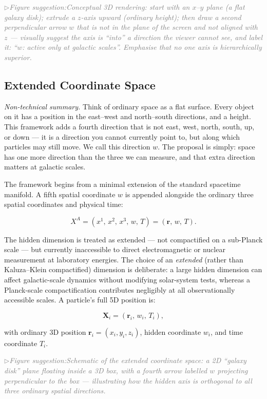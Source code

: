 \documentclass[11pt,a4paper]{article}
\newcommand{\XA}{X^A}                        %
\newcommand{\figsuggest}[1]{%
  \medskip
  \noindent\hspace{0pt}\textcolor{gray}{\small\itshape
    $\triangleright$\;Figure suggestion:\enspace #1}%
  \medskip}
\begin{document}
\figsuggest{Conceptual 3D rendering: start with an $x$--$y$ plane (a flat
galaxy disk); extrude a $z$-axis upward (ordinary height); then draw a
second perpendicular arrow $w$ that is \emph{not} in the plane of the screen
and not aligned with $z$ --- visually suggest the axis is ``into'' a
direction the viewer cannot see, and label it: ``$w$: active only at galactic
scales''.  Emphasise that no one axis is hierarchically superior.}

\subsection{Extended Coordinate Space}\label{sec:coords}

\textit{Non-technical summary.}\enspace
Think of ordinary space as a flat surface.  Every object on it has a position
in the east--west and north--south directions, and a height.  This framework
adds a fourth direction that is not east, west, north, south, up, or down ---
it is a direction you cannot currently point to, but along which particles may
still move.  We call this direction $w$.  The proposal is simply: space has
one more direction than the three we can measure, and that extra direction
matters at galactic scales.

The framework begins from a minimal extension of the standard spacetime
manifold.  A fifth spatial coordinate $w$ is appended alongside the ordinary
three spatial coordinates and physical time:

\[
  \XA = (x^1,\,x^2,\,x^3,\,w,\,T)
       = (\mathbf{r},\,w,\,T) .
\]

The hidden dimension is treated as extended --- not compactified on a
sub-Planck scale --- but currently inaccessible to direct electromagnetic
or nuclear measurement at laboratory energies.  The choice of an
\emph{extended} (rather than Kaluza--Klein compactified) dimension is
deliberate: a large hidden dimension can affect galactic-scale dynamics
without modifying solar-system tests, whereas a Planck-scale compactification
contributes negligibly at all observationally accessible scales.
A particle's full 5D position is:

\[
  \mathbf{X}_i = (\mathbf{r}_i,\,w_i,\,T_i) ,
\]

with ordinary 3D position $\mathbf{r}_i = (x_i,y_i,z_i)$, hidden coordinate
$w_i$, and time coordinate $T_i$.

\figsuggest{Schematic of the extended coordinate space: a 2D ``galaxy disk''
plane floating inside a 3D box, with a fourth arrow labelled $w$ projecting
perpendicular to the box --- illustrating how the hidden axis is orthogonal to
all three ordinary spatial directions.}
\end{document}
